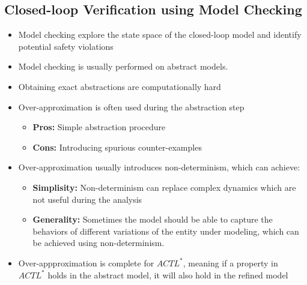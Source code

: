 \documentclass{llncs}
\begin{document}
\subsection{Closed-loop Verification using Model Checking}
\begin{itemize}
	\item Model checking explore the state space of the closed-loop model and identify potential safety violations
    \item Model checking is usually performed on abstract models.  
    \item Obtaining exact abstractions are computationally hard
    \item Over-approximation is often used during the abstraction step
        \begin{itemize}
        	\item \textbf{Pros: }Simple abstraction procedure 
            \item \textbf{Cons: }Introducing spurious counter-examples
        \end{itemize}
    \item Over-approximation usually introduces non-determinism, which can achieve:
    \begin{itemize}
        	\item \textbf{Simplisity: }Non-determinism can replace complex dynamics which are not useful during the analysis
            \item \textbf{Generality: }Sometimes the model should be able to capture the behaviors of different variations of the entity under modeling, which can be achieved using non-determinism.
        \end{itemize}
    \item Over-appproximation is complete for $ACTL^*$, meaning if a property in $ACTL^*$ holds in the abstract model, it will also hold in the refined model
\end{itemize}
\end{document}
